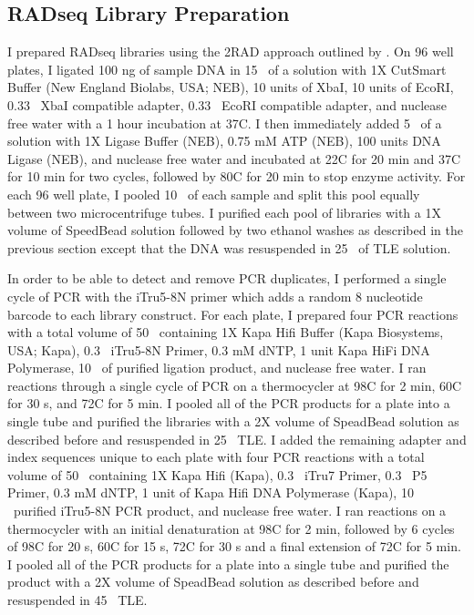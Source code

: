 \subsection{RADseq Library Preparation}
I prepared RADseq libraries using the 2RAD approach outlined by \cite{bayona-vasquez2019}. 
On 96 well plates, I ligated 100 ng of sample DNA in 15 \uL\ of a solution with 
1X CutSmart Buffer (New England Biolabs, USA; NEB), 10 units of XbaI,
10 units of EcoRI, 0.33 \uM\ XbaI compatible adapter, 0.33 \uM\ EcoRI compatible adapter,
and nuclease free water with a 1 hour incubation at 37\degree C. 
I then immediately added 5 \uL\ of a solution with 1X Ligase Buffer (NEB),
0.75 mM ATP (NEB), 100 units DNA Ligase (NEB), and nuclease free water 
and incubated at 22\degree C for 20 min and 37\degree C for 10 min for two cycles, 
followed by 80\degree C for 20 min to stop enzyme activity.
For each 96 well plate, I pooled 10 \uL\ of each sample and split this pool 
equally between two microcentrifuge tubes.
I purified each pool of libraries with a 1X volume of SpeedBead solution followed 
by two ethanol washes as described in the previous section except that the DNA 
was resuspended in 25 \uL\ of TLE solution. 

In order to be able to detect and remove PCR duplicates, I performed a single   
cycle of PCR with the iTru5-8N primer which adds a random 8 nucleotide barcode to 
each library construct.  
For each plate, I prepared four PCR reactions with a total volume of 
50 \uL\ containing 1X Kapa Hifi Buffer (Kapa Biosystems, USA; Kapa),
0.3 \uM\ iTru5-8N Primer, 0.3 mM dNTP, 1 unit Kapa HiFi DNA Polymerase,
10 \uL\ of purified ligation product, and nuclease free water.
I ran reactions through a single cycle of PCR on a thermocycler at 98\degree C for 2 min, 
60\degree C for 30 s, and 72\degree C for 5 min. 
I pooled all of the PCR products for a plate into a single tube and purified the
libraries with a 2X volume of SpeadBead solution as described before and 
resuspended in 25 \uL\ TLE.
I added the remaining adapter and index sequences unique to each plate with four PCR
reactions with a total volume of 50 \uL\ containing 1X Kapa Hifi (Kapa),
0.3 \uM\ iTru7 Primer, 0.3 \uM\ P5 Primer, 0.3 mM dNTP, 1 unit of Kapa Hifi DNA Polymerase (Kapa),
10 \uL\ purified iTru5-8N PCR product, and nuclease free water.
I ran reactions on a thermocycler with an initial denaturation at 98\degree C for 2 min, 
followed by 6 cycles of 98\degree C for 20 s, 60\degree C for 15 s, 72\degree C 
for 30 s and a final extension of 72\degree C for 5 min.
I pooled all of the PCR products for a plate into a single tube and purified the
product with a 2X volume of SpeadBead solution as described before and 
resuspended in 45 \uL\ TLE.

